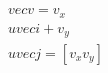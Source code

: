 \documentclass[preview]{standalone}
\begin{document}
\begin{align*}
\quad\\vec{v} = v_x \quad\\uvec{i} + v_y \quad\\uvec{j} = [v_x v_y]
\end{align*}
\end{document}
